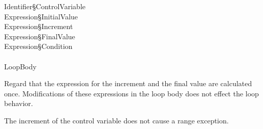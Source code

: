    Identifier\S ControlVariable \\
  Expression\S InitialValue \\
    Expression\S Increment \\
    Expression\S FinalValue \\
 Expression\S Condition \\
\\
\x   LoopBody \\

Regard that the expression for the increment and the final
value are calculated once. Modifications of these expressions
in the loop body does not effect the loop behavior.

The increment of the control variable does not cause
a range exception.

